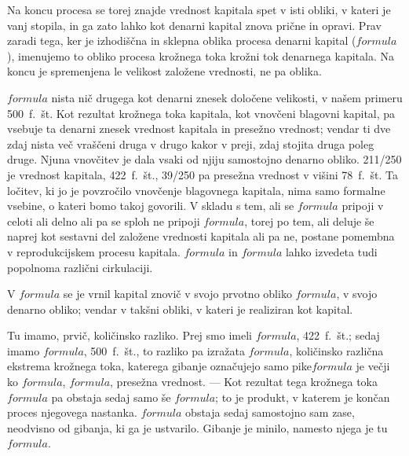 \documentclass[kapital_02.tex]{subfiles}
\begin{document}
Na koncu procesa se torej znajde vrednost kapitala spet v isti obliki, v kateri je vanj stopila, in ga zato lahko kot denarni kapital znova prične in opravi. Prav zaradi tega, ker je izhodiščna in sklepna oblika procesa denarni kapital (\( formula \)), imenujemo to obliko procesa krožnega toka krožni tok denarnega kapitala. Na koncu je spremenjena le velikost založene vrednosti, ne pa oblika.

\( formula \) nista nič drugega kot denarni znesek določene velikosti, v našem primeru 500~f.~št. Kot rezultat krožnega toka kapitala, kot vnovčeni blagovni kapital, pa vsebuje ta denarni znesek vrednost kapitala in presežno vrednost; vendar ti dve zdaj nista več vraščeni druga v drugo kakor v preji, zdaj stojita druga poleg druge. Njuna vnovčitev je dala vsaki od njiju samostojno denarno obliko. 211/250 je vrednost kapitala, 422~f.~št., 39/250 pa presežna vrednost v višini 78~f.~št. Ta ločitev, ki jo je povzročilo vnovčenje blagovnega kapitala, nima samo formalne vsebine, o kateri bomo takoj govorili. V skladu s tem, ali se \( formula \) pripoji v celoti ali delno ali pa se sploh ne pripoji \( formula \), torej po tem, ali deluje še naprej kot sestavni del založene vrednosti kapitala ali pa ne, postane pomembna v reprodukcijskem procesu kapitala. \( formula \) in \( formula \) lahko izvedeta tudi popolnoma različni cirkulaciji.

V \( formula \) se je vrnil kapital znovič v svojo prvotno obliko \( formula \), v svojo denarno obliko; vendar v takšni obliki, v kateri je realiziran kot kapital.

Tu imamo, prvič, količinsko razliko. Prej smo imeli \( formula \), 422~f.~št.; sedaj imamo \( formula \), 500~f.~št., to razliko pa izražata \( formula \), količinsko različna ekstrema krožnega toka, katerega gibanje označujejo samo pike\( formula \) je večji ko \( formula \), \( formula \), presežna vrednost. --- Kot rezultat tega krožnega toka \( formula \) pa obstaja sedaj samo še \( formula \); to je produkt, v katerem je končan proces njegovega nastanka. \( formula \) obstaja sedaj samostojno sam zase, neodvisno od gibanja, ki ga je ustvarilo. Gibanje je minilo, namesto njega je tu \( formula \).
\end{document}
